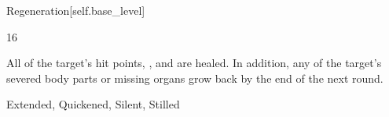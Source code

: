 \begin{spellsection}{Regeneration}[self.base_level]
\begin{spellcontent}
\begin{spelltargetinginfo}
 16
\end{spelltargetinginfo}
\begin{spelleffects}
\spelleffect
All of the target's hit points, , and  are healed.
In addition, any of the target's severed body parts or missing organs grow back by the end of the next round.
\end{spelleffects}
\end{spellcontent}
\begin{spellfooter}
 Extended, Quickened, Silent, Stilled
\end{spellfooter}
\begin{spellsubcontent}
\end{spellsubcontent}
\end{spellsection}
